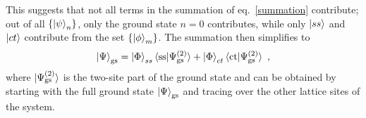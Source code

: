 \documentclass[reprint,superscriptaddress,floatfix]{revtex4-2}
\begin{document}
This suggests that not all terms in the summation of eq.~\ref{summation} contribute; out of all \(\left\{ \ket{\psi}_n \right\} \), only the ground state \(n=0\) contributes, while only \(\ket{ss}\) and \(\ket{ct}\) contribute from the set \(\left\{ \ket{\phi}_m \right\} \). The summation then simplifies to
\begin{equation}\begin{aligned}
	\ket{\Psi}_\text{gs} = \ket{\Phi}_{ss}\braket{\text{ss}|\Psi^{(2)}_\text{gs}} + \ket{\Phi}_{ct}\braket{\text{ct}|\Psi^{(2)}_\text{gs}}~,
\end{aligned}\end{equation}
where \(\ket{\Psi^{(2)}_\text{gs}}\) is the two-site part of the ground state and can be obtained by starting with the full ground state \(\ket{\Psi}_\text{gs}\) and tracing over the other lattice sites of the system.
\end{document}
